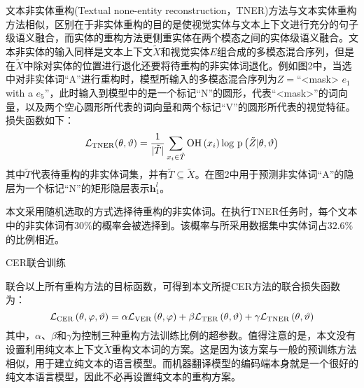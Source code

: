 
文本非实体重构(Textual none-entity reconstruction，TNER)方法与文本实体重构方法相似，区别在于非实体重构的目的是使视觉实体与文本上下文进行充分的句子级语义融合，而实体的重构方法更侧重实体在两个模态之间的实体级语义融合。文本非实体的输入同样是文本上下文$\tilde{X}$和视觉实体$E$组合成的多模态混合序列，但是在$\tilde{X}$中除对实体的位置进行退化还要将待重构的非实体词退化。例如图2中，当选中对非实体词“A”进行重构时，模型所输入的多模态混合序列为$Z=$“<mask> $e_1$ with a $e_5$”，此时输入到模型中的是一个标记“N”的圆形，代表“<mask>”的词向量，以及两个空心圆形所代表的词向量和两个标记“V”的圆形所代表的视觉特征。损失函数如下：
\begin{equation}
\mathcal{L}_{\rm{TNER}}(\theta, \vartheta) =
    \frac{1}{{\vert}\tilde{T}{\vert}}
    \mathop{\sum}_{x_i \in \tilde{T}}
    {\rm{OH}} \left( x_i \right)
    {\rm log}{\ }{\rm p} \left( \tilde{Z} {\vert} \theta, \vartheta \right)
\end{equation}
其中$\tilde{T}$代表待重构的非实体词集，并有$\tilde{T}\subseteq \tilde{X}$。在图2中用于预测非实体词“A”的隐层为一个标记“N”的矩形隐层表示${\boldsymbol{h}_1^l}$。

本文采用随机选取的方式选择待重构的非实体词。在执行TNER任务时，每个文本中的非实体词有$30\%$的概率会被选择到。该概率与所采用数据集中实体词占$32.6\%$的比例相近。

{\sffamily CER联合训练}

联合以上所有重构方法的目标函数，可得到本文所提CER方法的联合损失函数为：
\begin{equation}
\mathcal{L}_{\rm{CER}} \left( \theta, \varphi, \vartheta \right) = \alpha \mathcal{L}_{\rm{VER}} \left( \theta, \varphi \right) + \beta \mathcal{L}_{\rm{TER}} \left( \theta, \vartheta \right) + \gamma \mathcal{L}_{\rm{TNER}} \left( \theta, \vartheta \right)
\label{eq:4_combined_cer}
\end{equation}
其中，$\alpha$、$\beta$和$\gamma$为控制三种重构方法训练比例的超参数。值得注意的是，本文没有设置利用纯文本上下文$\tilde{X}$重构文本词的方案。这是因为该方案与一般的预训练方法相似，用于建立纯文本的语言模型。而机器翻译模型的编码端本身就是一个很好的纯文本语言模型，因此不必再设置纯文本的重构方案。

